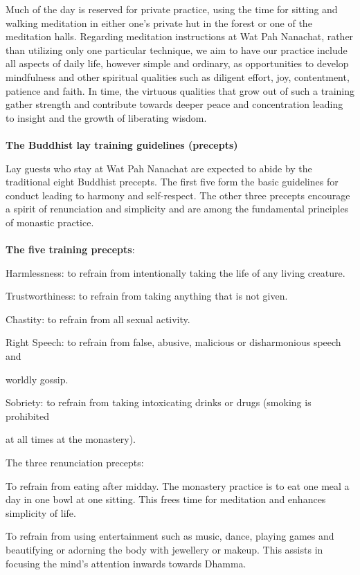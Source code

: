 Much of the day is reserved for private practice, using the time for
sitting and walking meditation in either one's private hut in the forest
or one of the meditation halls. Regarding meditation instructions at Wat
Pah Nanachat, rather than utilizing only one particular technique, we
aim to have our practice include all aspects of daily life, however
simple and ordinary, as opportunities to develop mindfulness and other
spiritual qualities such as diligent effort, joy, contentment, patience
and faith. In time, the virtuous qualities that grow out of such a
training gather strength and contribute towards deeper peace and
concentration leading to insight and the growth of liberating
wisdom.\\\\\textbf{The Buddhist lay training guidelines (precepts)}

Lay guests who stay at Wat Pah Nanachat are expected to abide by the
traditional eight Buddhist precepts. The first five form the basic
guidelines for conduct leading to harmony and self-respect. The other
three precepts encourage a spirit of renunciation and simplicity and are
among the fundamental principles of monastic practice.\\\\\textbf{The
five training precepts}:

Harmlessness: to refrain from intentionally taking the life of any
living creature.

Trustworthiness: to refrain from taking anything that is not given.

Chastity: to refrain from all sexual activity.

Right Speech: to refrain from false, abusive, malicious or disharmonious
speech and

worldly gossip.

Sobriety: to refrain from taking intoxicating drinks or drugs (smoking
is prohibited

at all times at the monastery).

The three renunciation precepts:

To refrain from eating after midday. The monastery practice is to eat
one meal a day in one bowl at one sitting. This frees time for
meditation and enhances simplicity of life.

To refrain from using entertainment such as music, dance, playing games
and beautifying or adorning the body with jewellery or makeup. This
assists in focusing the mind's attention inwards towards Dhamma.

